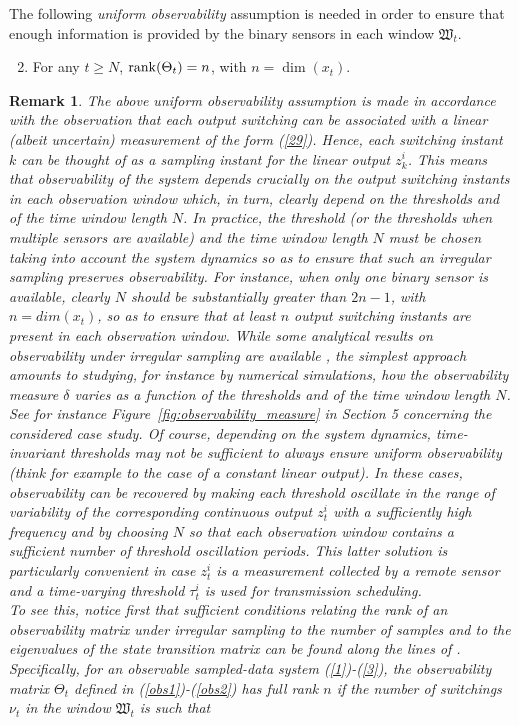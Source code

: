 \documentclass[11pt,journal,onecolumn]{IEEEtran}
\newtheorem{remark}{Remark}
\begin{document}
The following {\em uniform observability} assumption is needed in order to ensure that enough information is provided by the binary sensors in each window $\mathfrak{W}_t$. \vspace{.3cm}

\begin{enumerate}[\bf {A}1]
\setcounter{enumi}{1}
\item \label{44}
For any $ t\geq N$, ${\rm rank}(\Theta_{t})=n$, with $n=\dim(x_{t})$.
\end{enumerate}\vspace{.3cm}

\begin{remark}
The above uniform observability assumption is made in accordance with the observation that each output switching can be associated with a linear (albeit uncertain) measurement of the form  (\ref{29}).  Hence, each switching instant $k$ can be thought of as a sampling instant for the linear output $z^i_k$.
This means that observability of the system depends crucially on the output switching instants in each observation window which, in turn, clearly depend on the thresholds and of the time window length $N$. In practice, the threshold (or the thresholds when multiple sensors are available)  and the time window length $N$ must be chosen taking into account the system dynamics so as to ensure that such an irregular sampling preserves observability. For instance, when only one binary sensor is available, clearly $N$ should be substantially greater than $2n-1$, with $n=dim(x_t)$, so as to ensure that at least $n$ output switching instants are present in each observation window. While some analytical results on observability under irregular sampling are available \cite{Irr-sampling}, the simplest approach amounts to studying, for instance by numerical simulations, how the observability measure $\delta$ varies as a function of the thresholds and of the time window length $N$. See for instance Figure~\ref{fig:observability_measure} in Section 5 concerning the considered case study. Of course, depending on the system dynamics, time-invariant thresholds may not be sufficient to always ensure uniform observability (think for example to the case of a constant linear output). In these cases, observability can be recovered by making each threshold oscillate in the range of variability of the corresponding continuous output $z^i_t$ with a sufficiently high frequency  and by choosing $N$ so that each observation window contains a sufficient number of threshold oscillation periods. This latter solution is particularly convenient in case $z^i_t$ is a measurement collected by a remote sensor and a time-varying threshold $\tau^i_t$ is used for transmission scheduling. \\ To see this, notice first that sufficient conditions relating the rank of an observability matrix under irregular sampling to the number of samples and to the eigenvalues of the state transition matrix can be found along the lines of \cite{Irr-sampling}. Specifically, for an observable sampled-data system (\ref{1})-(\ref{3}), the observability matrix $\Theta_t$ defined in (\ref{obs1})-(\ref{obs2}) has full rank $n$ if the number of switchings $\nu_t$ in the window $\mathfrak{W}_t$ is such that

\end{remark}
\end{document}
